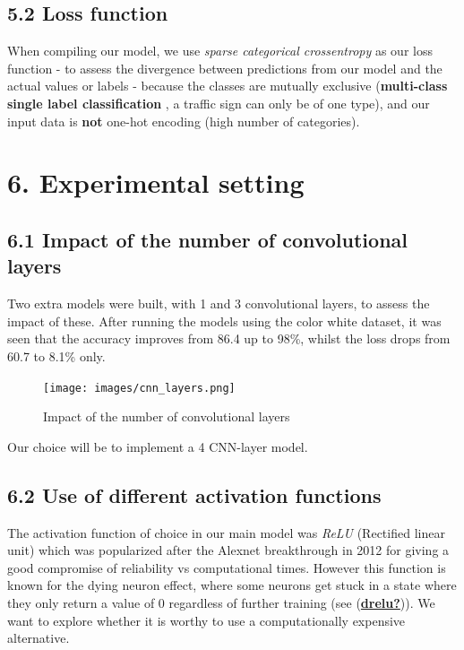\documentclass[
  11pt,
]{article}
\begin{document}
\hypertarget{loss-function}{%
\subsection{5.2 Loss function}\label{loss-function}}

When compiling our model, we use \emph{sparse categorical crossentropy}
as our loss function - to assess the divergence between predictions from
our model and the actual values or labels - because the classes are
mutually exclusive (\textbf{multi-class single label classification} , a
traffic sign can only be of one type), and our input data is
\textbf{not} one-hot encoding (high number of categories).

\pagebreak

\hypertarget{experimental-setting}{%
\section{6. Experimental setting}\label{experimental-setting}}

\hypertarget{impact-of-the-number-of-convolutional-layers}{%
\subsection{6.1 Impact of the number of convolutional
layers}\label{impact-of-the-number-of-convolutional-layers}}

Two extra models were built, with 1 and 3 convolutional layers, to
assess the impact of these. After running the models using the color
white dataset, it was seen that the accuracy improves from 86.4 up to
98\%, whilst the loss drops from 60.7 to 8.1\% only.

\begin{figure}
\centering
\texttt{[image: images/cnn\_layers.png]}
\caption{Impact of the number of convolutional layers}
\end{figure}

Our choice will be to implement a 4 CNN-layer model.

\hypertarget{use-of-different-activation-functions}{%
\subsection{6.2 Use of different activation
functions}\label{use-of-different-activation-functions}}

The activation function of choice in our main model was \emph{ReLU}
(Rectified linear unit) which was popularized after the Alexnet
breakthrough in 2012 for giving a good compromise of reliability vs
computational times. However this function is known for the dying neuron
effect, where some neurons get stuck in a state where they only return a
value of 0 regardless of further training (see
(\protect\hyperlink{ref-drelu}{\textbf{drelu?}})). We want to explore
whether it is worthy to use a computationally expensive alternative.
\end{document}
